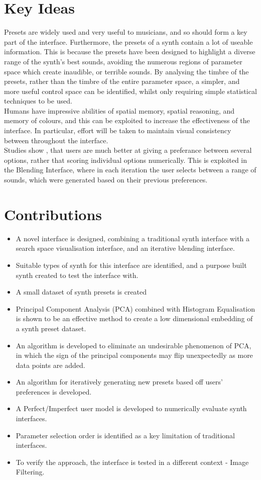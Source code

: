 \documentclass[11pt, oneside]{report}   	%
\begin{document}
\section{Key Ideas}
Presets are widely used and very useful to musicians, and so should form a key part of the interface. Furthermore, the presets of a synth contain a lot of useable information. This is because the presets have been designed to highlight a diverse range of the synth's best sounds, avoiding the numerous regions of parameter space which create inaudible, or terrible sounds. By analysing the timbre of the presets, rather than the timbre of the entire parameter space, a simpler, and more useful control space can be identified, whilst only requiring simple statistical techniques to be used.\\
%
Humans have impressive abilities of spatial memory, spatial reasoning, and memory of colours, and this can be exploited to increase the effectiveness of the interface. In particular, effort will be taken to maintain visual consistency between throughout the interface.\\
%
Studies show \cite{RatingRanking, PreferenceGallery}, that users are much better at giving a preferance between several options, rather that scoring individual options numerically. This is exploited in the Blending Interface, where in each iteration the user selects between a range of sounds, which were generated based on their previous preferences.
%
\section{Contributions}
\begin{itemize}
	\setlength\itemsep{-1.0em}
	\item A novel interface is designed, combining a traditional synth interface with a search space visualisation interface, and an iterative blending interface.
	\item Suitable types of synth for this interface are identified, and a purpose built synth created to test the interface with.
	\item A small dataset of synth presets is created
	\item Principal Component Analysis (PCA) combined with Histogram Equalisation is shown to be an effective method to create a low dimensional embedding of a synth preset dataset.
	\item An algorithm is developed to eliminate an undesirable phenomenon of PCA, in which the sign of the principal components may flip unexpectedly as more data points are added.
	\item An algorithm for iteratively generating new presets based off users' preferences is developed.
	\item A Perfect/Imperfect user model is developed to numerically evaluate synth interfaces.
	\item Parameter selection order is identified as a key limitation of traditional interfaces.
	\item To verify the approach, the interface is tested in a different context - Image Filtering.
\end{itemize}
\end{document}
